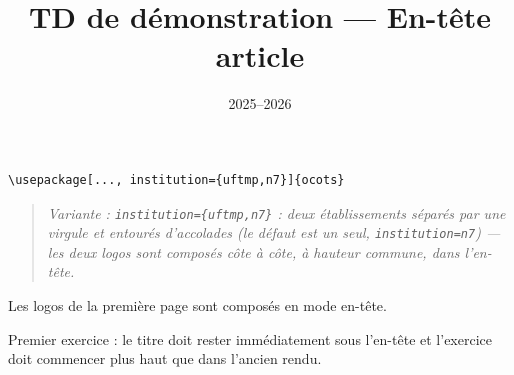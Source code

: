 \documentclass[11pt]{ocots-td}
\title{TD de démonstration — En-tête article}
\date{2025--2026}
\newcommand{\ocotsvariantnote}[1]{\begin{quote}\itshape Variante : #1\end{quote}}
\begin{document}
\maketitle

\begin{lstlisting}
\usepackage[..., institution={uftmp,n7}]{ocots}
\end{lstlisting}
\ocotsvariantnote{\texttt{institution=\{uftmp,n7\}} : deux établissements
séparés par une virgule et entourés d'accolades (le défaut est un seul,
\texttt{institution=n7}) — les deux logos sont composés côte à côte, à
hauteur commune, dans l'en-tête.}

\begin{instructions}
    Les logos de la première page sont composés en mode en-tête.
\end{instructions}

\begin{exercise}[points=2]
    Premier exercice : le titre doit rester immédiatement sous l'en-tête et
    l'exercice doit commencer plus haut que dans l'ancien rendu.
\end{exercise}
\end{document}
